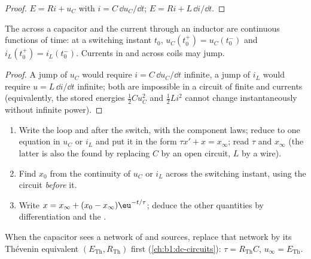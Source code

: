 \begin{proof}
 $E = Ri + u_C$ with $i = C\,\dd u_C/\dd t$; 
$E = Ri + L\,\dd i/\dd t$.
\end{proof}

\begin{proposition}\label{prop:b1:transient-regimes:continuity}
The  across a capacitor and the current through an inductor are
continuous functions of time: at a switching instant $t_0$,
$u_C(t_0^+) = u_C(t_0^-)$ and $i_L(t_0^+) = i_L(t_0^-)$. Currents in
 and  across coils may jump.
\end{proposition}

\begin{proof}
A jump of $u_C$ would require $i = C\,\dd u_C/\dd t$ infinite, a jump
of $i_L$ would require $u = L\,\dd i/\dd t$ infinite; both are
impossible in a circuit of finite  and currents (equivalently,
the stored energies $\tfrac12 Cu_C^2$ and $\tfrac12 Li^2$ cannot change
instantaneously without infinite power).
\end{proof}

\begin{method}\label{met:b1:transient-regimes:first}
\begin{enumerate}
  \item Write the loop and  after the switch, with the
        component laws; reduce to one equation in $u_C$ or $i_L$ and
        put it in the form $\tau x' + x = x_\infty$; read $\tau$ and
        $x_\infty$ (the latter is also the  found by
        replacing $C$ by an open circuit, $L$ by a wire).
  \item Find $x_0$ from the continuity of $u_C$ or $i_L$ across the
        switching instant, using the circuit \emph{before} it.
  \item Write $x = x_\infty + (x_0 - x_\infty)\eu^{-t/\tau}$; deduce
        the other quantities by differentiation and the .
\end{enumerate}
When the capacitor sees a network of  and sources, replace
that network by its Thévenin equivalent $(E_{\mathrm{Th}}, R_{\mathrm{Th}})$
first (\cref{ch:b1:dc-circuits}): $\tau = R_{\mathrm{Th}}C$,
$u_\infty = E_{\mathrm{Th}}$.
\end{method}

